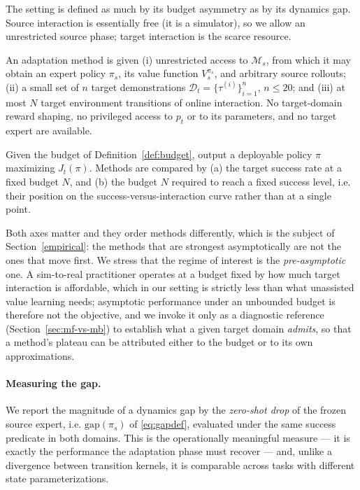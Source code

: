 The setting is defined as much by its budget asymmetry as by its dynamics gap.
Source interaction is essentially free (it is a simulator), so we allow an
unrestricted source phase; target interaction is the scarce resource.

\begin{definition}
\label{def:budget}
An adaptation method is given
(i) unrestricted access to $\mathcal{M}_s$, from which it may obtain an expert
policy $\pi_s$, its value function $V^{\pi_s}_{s}$, and arbitrary
source rollouts;
(ii) a small set of $n$ target demonstrations
$\mathcal{D}_t = \{\tau^{(i)}\}_{i=1}^{n}$, $n \le 20$; and
(iii) at most $N$ target environment transitions of online interaction.
No target-domain reward shaping, no privileged access to $p_t$ or to its
parameters, and no target expert are available.
\end{definition}

\begin{definition}
Given the budget of Definition~\ref{def:budget}, output a deployable policy
$\pi$ maximizing $J_{t}(\pi)$. Methods are compared by
(a) the target success rate at a fixed budget $N$, and (b) the budget $N$
required to reach a fixed success level, i.e. their position on the
success-versus-interaction curve rather than at a single point.
\end{definition}

Both axes matter and they order methods differently, which is the subject of
Section~\ref{empirical}: the methods that are strongest asymptotically are not
the ones that move first. We stress that the regime of interest is the
\emph{pre-asymptotic} one. A sim-to-real practitioner operates at a budget
fixed by how much target interaction is affordable, which in our setting is
strictly less than what unassisted value learning needs; asymptotic performance
under an unbounded budget is therefore not the objective, and we invoke it only
as a diagnostic reference (Section~\ref{sec:mf-vs-mb}) to establish what a
given target domain \emph{admits}, so that a method's plateau can be attributed
either to the budget or to its own approximations.

\paragraph{Measuring the gap.}
We report the magnitude of a dynamics gap by the \emph{zero-shot drop} of the
frozen source expert, i.e. $\mathrm{gap}(\pi_s)$ of \eqref{eq:gapdef},
evaluated under the same success predicate in both domains. This is the
operationally meaningful measure --- it is exactly the performance the
adaptation phase must recover --- and, unlike a divergence between transition
kernels, it is comparable across tasks with different state
parameterizations.


